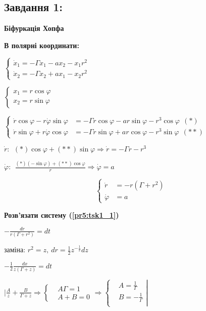 \subsection{Завдання 1:}

\textbf{Біфуркація Хопфа}

\textbf{В полярні координати:} 

$\left\{\begin{aligned}
    \dot{x}_1 = -\Gamma x_1 - ax_2 - x_1r^2\\
    \dot{x}_2 = -\Gamma x_2 + ax_1 - x_2r^2
\end{aligned}\right.$

$\left\{\begin{aligned}
    x_1 = r\cos\varphi \\
    x_2 = r\sin\varphi
\end{aligned}\right.$

$\left\{\begin{aligned}
    \dot{r}\cos\varphi - r\dot{\varphi}\sin\varphi &= -\Gamma r\cos\varphi - ar\sin\varphi - r^3\cos\varphi \ \ (*)\\
    \dot{r}\sin\varphi + r\dot{\varphi}\cos\varphi &= -\Gamma r\sin\varphi + ar\cos\varphi - r^3\sin\varphi \ \ (**)
\end{aligned}\right.$

$\dot{r}:\ \ (*)\cos\varphi + (**)\sin\varphi \Longrightarrow \dot{r} = -\Gamma r - r^3$

$\dot{\varphi}:\ \ \frac{(*)(-\sin\varphi) + (**)\cos\varphi}{r} \Longrightarrow \dot{\varphi} = a$


\begin{equation} \label{pr5:tsk1_1}
    \left\{\begin{aligned}
        \dot{r} &= -r(\Gamma + r^2)\\
        \dot{\varphi} &= a
    \end{aligned}\right.
\end{equation}

\textbf{Розв'язати систему (\ref{pr5:tsk1_1})}

$-\frac{dr}{r(\Gamma + r^2)} = dt$

заміна: $r^2 = z, \ dr = \frac{1}{2}z^{-\frac{1}{2}} dz $

$-\frac{1}{2}\frac{dx}{z(\Gamma + z)} = dt$

$\Bigg | \frac{A}{z} + \frac{B}{\Gamma + z} \Longrightarrow 
\left\{\begin{aligned}
    &A\Gamma = 1\\
    &A+B = 0 
\end{aligned}\right. \Longrightarrow 
\left\{\begin{aligned}
    &A = \frac{1}{\Gamma} \\
    &B = -\frac{1}{\Gamma} \\
\end{aligned}\right|$

